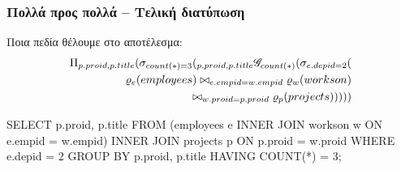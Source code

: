 \begin{frame}
\frametitle{Πολλά προς πολλά -- Τελική διατύπωση}
\begin{minipage}{\wE}
\vspace{-0.5cm}
\begin{block}{\small Ποια πεδία θέλουμε στο αποτέλεσμα:}
\[
\begin{split}
  \Pi_{p.proid, p.title}
  (
    \sigma_{count(*)=3}
    (
      {}_{p.proid, p.title} \mathscr{G}_{count(*)}
      (
        \sigma_{e.depid=2}
        (                           \\
          \varrho_{e} (employees) \bowtie_{e.empid=w.empid} \varrho_{w} (workson)  \\
                                  \bowtie_{w.proid=p.proid} \varrho_{p} (projects)
        )
      )
    )
  )
\end{split}
\]
\pause
\vspace{-0.5cm}
\en
\begin{SQL}
  SELECT p.proid, p.title
    FROM (employees e INNER JOIN workson  w
                         ON e.empid = w.empid)
                      INNER JOIN projects p
                         ON p.proid = w.proid
   WHERE e.depid = 2
GROUP BY p.proid, p.title
  HAVING COUNT(*) = 3;
\end{SQL}
\el
\end{block}
\end{minipage}
\end{frame}



